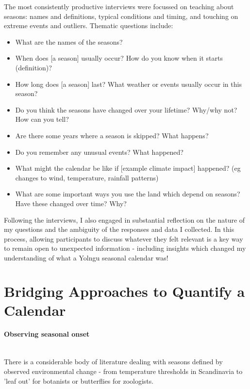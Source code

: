 The most consistently productive interviews were focussed on teaching about
seasons: names and definitions, typical conditions and timing, and touching on
extreme events and outliers. Thematic questions include:
\begin{itemize}
\item What are the names of the seasons?
\item When does [a season] usually occur?  How do you know when it starts (definition)?
\item How long does [a season] last?  What weather or events usually occur in this season?
\item Do you think the seasons have changed over your lifetime?  Why/why not?  How can you tell?
\item Are there some years where a season is skipped?  What happens?
\item Do you remember any unusual events?  What happened?
\item What might the calendar be like if [example climate impact] happened? 
      (eg changes to wind, temperature, rainfall patterns) 
\item What are some important ways you use the land which depend on seasons?
        Have these changed over time?  Why?
\end{itemize}

Following the interviews, I also engaged in substantial reflection on the nature
of my questions and the ambiguity of the responses and data I collected.
In this process, allowing participants to discuss whatever they felt relevant
is a key way to remain open to unexpected information - including insights
which changed my understanding of what a Yolngu seasonal calendar was!






\section{Bridging Approaches to Quantify a Calendar}


\paragraph{Observing seasonal onset}~\\
There is a considerable body of literature dealing with seasons defined
by observed environmental change - from temperature thresholds in
Scandinavia to 'leaf out' for botanists or butterflies for zoologists.

